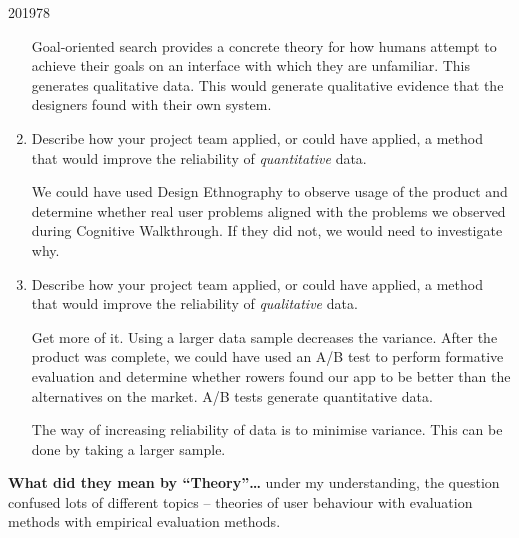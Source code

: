 \documentclass[10pt,\jkfside,a4paper]{article}
\begin{document}
\begin{examquestion}{2019}{7}{8}
\begin{enumerate}
Goal-oriented search provides a concrete theory for how humans attempt to
achieve their goals on an interface with which they are unfamiliar. This
generates qualitative data. This would generate qualitative evidence that
the designers found with their own system.

\item Describe how your project team applied, or could have applied, a
method that would improve the reliability of \textit{quantitative} data.

We could have used Design Ethnography to observe usage of the product and
determine whether real user problems aligned with the problems we observed
during Cognitive Walkthrough. If they did not, we would need to investigate
why.

\item Describe how your project team applied, or could have applied, a
method that would improve the reliability of \textit{qualitative} data.

Get more of it. Using a larger data sample decreases the variance. After
the product was complete, we could have used an A/B test to perform
formative evaluation and determine whether rowers found our app to be
better than the alternatives on the market. A/B tests generate quantitative
data.

The way of increasing reliability of data is to minimise variance. This can
be done by taking a larger sample.

\end{enumerate}

\textbf{What did they mean by ``Theory''\ldots} under my understanding, the
question confused lots of different topics -- theories of user behaviour
with evaluation methods with empirical evaluation methods.

\end{examquestion}
\end{document}
